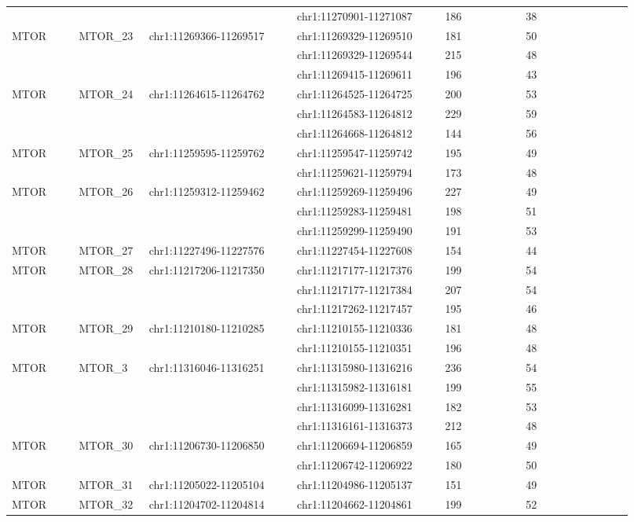 \begin{landscape}
\begin{longtable}{p{0.1\linewidth}|p{0.1\linewidth}p{0.22\linewidth}p{0.22\linewidth}p{0.12\linewidth}p{0.16\linewidth}}
\\
 & & & chr1:11270901-11271087 & 186 & 38
\\
MTOR & MTOR\_23 & chr1:11269366-11269517 & chr1:11269329-11269510 & 181 & 50
\\
 & & & chr1:11269329-11269544 & 215 & 48
\\
 & & & chr1:11269415-11269611 & 196 & 43
\\
MTOR & MTOR\_24 & chr1:11264615-11264762 & chr1:11264525-11264725 & 200 & 53
\\
 & & & chr1:11264583-11264812 & 229 & 59
\\
 & & & chr1:11264668-11264812 & 144 & 56
\\
MTOR & MTOR\_25 & chr1:11259595-11259762 & chr1:11259547-11259742 & 195 & 49
\\
 & & & chr1:11259621-11259794 & 173 & 48
\\
MTOR & MTOR\_26 & chr1:11259312-11259462 & chr1:11259269-11259496 & 227 & 49
\\
 & & & chr1:11259283-11259481 & 198 & 51
\\
 & & & chr1:11259299-11259490 & 191 & 53
\\
MTOR & MTOR\_27 & chr1:11227496-11227576 & chr1:11227454-11227608 & 154 & 44
\\
MTOR & MTOR\_28 & chr1:11217206-11217350 & chr1:11217177-11217376 & 199 & 54
\\
 & & & chr1:11217177-11217384 & 207 & 54
\\
 & & & chr1:11217262-11217457 & 195 & 46
\\
MTOR & MTOR\_29 & chr1:11210180-11210285 & chr1:11210155-11210336 & 181 & 48
\\
 & & & chr1:11210155-11210351 & 196 & 48
\\
MTOR & MTOR\_3 & chr1:11316046-11316251 & chr1:11315980-11316216 & 236 & 54
\\
 & & & chr1:11315982-11316181 & 199 & 55
\\
 & & & chr1:11316099-11316281 & 182 & 53
\\
 & & & chr1:11316161-11316373 & 212 & 48
\\
MTOR & MTOR\_30 & chr1:11206730-11206850 & chr1:11206694-11206859 & 165 & 49
\\
 & & & chr1:11206742-11206922 & 180 & 50
\\
MTOR & MTOR\_31 & chr1:11205022-11205104 & chr1:11204986-11205137 & 151 & 49
\\
MTOR & MTOR\_32 & chr1:11204702-11204814 & chr1:11204662-11204861 & 199 & 52
\\

\end{longtable}
\end{landscape}
